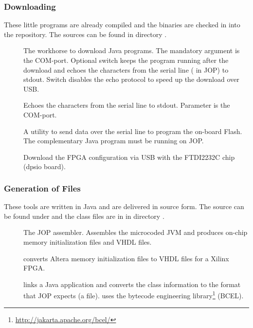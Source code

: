 \subsubsection{Downloading}

These little programs are already compiled and the binaries are
checked in into the repository. The sources can be found in directory
.

\begin{description}
    \item[] The workhorse to download Java programs. The
    mandatory argument is the COM-port. Optional switch 
    keeps the program running after the download and echoes the
    characters from the serial line ( in JOP) to
    stdout. Switch  disables the echo protocol to speed up the
    download over USB.
    \item[] Echoes the characters from the serial line
        to stdout. Parameter is the COM-port.
    \item[] A utility to send data over the serial
        line to program the on-board Flash. The complementary
        Java program  must be running on JOP.
    \item[] Download the FPGA configuration via
    USB with the FTDI2232C chip (dpsio board).
\end{description}

\subsubsection{Generation of Files}

These tools are written in Java and are delivered in source form.
The source can be found under  and the class
files are in  in directory
.

\begin{description}
    \item[] The JOP assembler. Assembles the microcoded
    JVM and produces on-chip memory initialization files and VHDL
    files.
    \item[] converts Altera memory initialization
        files to VHDL files for a Xilinx FPGA.
    \item[] links a Java application and converts the
    class information to the format that JOP expects (a  file).
     uses the bytecode engineering library\footnote{\url{http://jakarta.apache.org/bcel/}} (BCEL).

\end{description}

